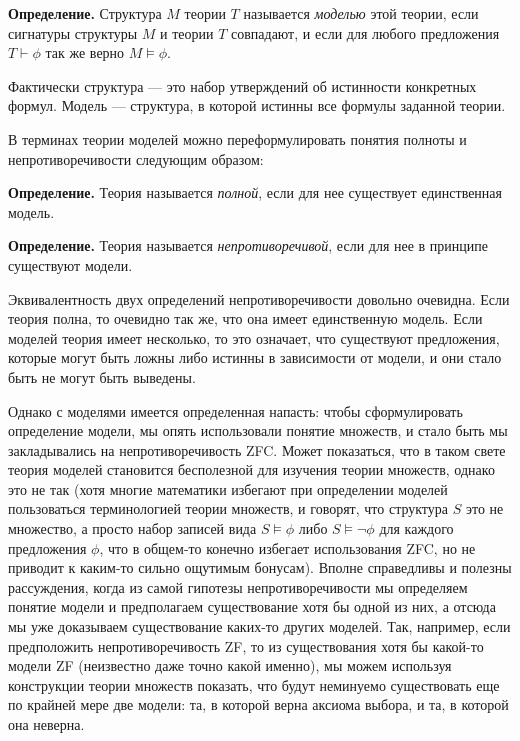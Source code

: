 {\bfseries Определение.} Структура $M$ теории $T$ называется {\slshape моделью} этой теории, если сигнатуры структуры $M$ и теории $T$ совпадают, и если для любого предложения $T\vdash\phi$ так же верно $M\models\phi$.

Фактически структура — это набор утверждений об истинности конкретных формул. Модель — структура, в которой истинны все формулы заданной теории.

В терминах теории моделей можно переформулировать понятия полноты и непротиворечивости следующим образом:

{\bfseries Определение.} Теория называется {\slshape полной}, если для нее существует единственная модель.

{\bfseries Определение.} Теория называется {\slshape непротиворечивой}, если для нее в принципе существуют модели.

Эквивалентность двух определений непротиворечивости довольно очевидна. Если теория полна, то очевидно так же, что она имеет единственную модель. Если моделей теория имеет несколько, то это означает, что существуют предложения, которые могут быть ложны либо истинны в зависимости от модели, и они стало быть не могут быть выведены.

Однако с моделями имеется определенная напасть: чтобы сформулировать определение модели, мы опять использовали понятие множеств, и стало быть мы закладывались на непротиворечивость ZFC. Может показаться, что в таком свете теория моделей становится бесполезной для изучения теории множеств, однако это не так (хотя многие математики избегают при определении моделей пользоваться терминологией теории множеств, и говорят, что структура $S$ это не множество, а просто набор записей вида $S\models\phi$ либо $S\models \neg\phi$ для каждого предложения $\phi$, что в общем-то конечно избегает использования ZFC, но не приводит к каким-то сильно ощутимым бонусам). Вполне справедливы и полезны рассуждения, когда из самой гипотезы непротиворечивости мы определяем понятие модели и предполагаем существование хотя бы одной из них, а отсюда мы уже доказываем существование каких-то других моделей. Так, например, если предположить непротиворечивость ZF, то из существования хотя бы какой-то модели ZF (неизвестно даже точно какой именно), мы можем используя конструкции теории множеств показать, что будут неминуемо существовать еще по крайней мере две модели: та, в которой верна аксиома выбора, и та, в которой она неверна.

